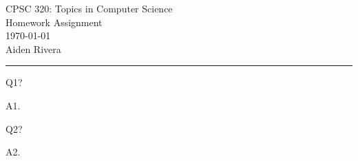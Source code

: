 \documentclass[12pt, letterpaper, onecolumn]{exam}
\begin{document}
\nopointsinmargin
\pointformat{}

\begingroup
\centering
\LARGE CPSC 320: Topics in Computer Science\\[0.5em]
\LARGE Homework Assignment\\[0.5em]
\large \today\\[0.5em]
\large Aiden Rivera\par
\endgroup

\rule{\textwidth}{0.4pt}

\printanswers
\renewcommand{\solutiontitle}{\noindent\textbf{Ans:}\enspace}

\begin{questions}
\question[0] Q1?

\begin{solution}
A1.
\end{solution}

\question[0] Q2?

\begin{solution}
A2.
\end{solution}

\end{questions}
\end{document}
